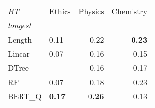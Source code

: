 \begin{tabular}{llrr}
\toprule
\textit{BT} & Ethics &  Physics &  Chemistry \\
\textit{longest}  &        &          &            \\
\midrule
Length &   0.11 &     0.22 &       \textbf{0.23} \\
Linear &   0.07 &     0.16 &       0.15 \\
DTree  &      - &     0.16 &       0.17 \\
RF     &   0.07 &     0.18 &       0.23 \\
BERT\_Q &   \textbf{0.17} &     \textbf{0.26} &       0.13 \\
\bottomrule
\end{tabular}
